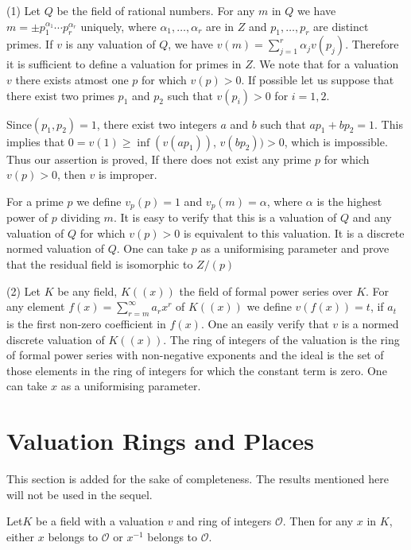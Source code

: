 \begin{examples*}
  (1)  Let $Q$ be the field of rational numbers. For any $m$ in $Q$
  we have $m = \pm p^{\alpha_1}_1 \cdots p^{\alpha_r}_r$ uniquely,
  where $\alpha_1, \ldots, \alpha_r$ are in $Z$ and $p_1, \ldots, p_r$
  are distinct primes. If $v$ is any valuation of $Q$, we have $v (m)
  = \sum\limits^r_{j=1} \alpha_j v (p_j)$. Therefore it is sufficient
  to define a valuation for primes in $Z$. We note that for a
  valuation $v$ there exists atmost one $p$ for which $v(p)> 0$. If
  possible let us suppose that there exist two primes $p_1$ and $p_2$
  such that $v(p_i)> 0$ for $i = 1, 2$. 
  
  Since\pageoriginale $(p_1, p_2)=1$, there exist two integers $a$ and
  $b$ such that 
  $ap_1 + bp_2 =1$. This implies that $0=v (1) \geq \inf (v(ap_1))$, $v
  (bp_2))>0$, which is impossible. Thus our assertion is proved, If
  there does not exist any prime $p$ for which $v(p)>0$, then $v$ is
  improper.  
  
  For  a prime $p$ we define $v_p(p) =1$ and $v_p(m)= \alpha$, where
  $\alpha$ is the highest power of $p$ dividing $m$. It is easy to
  verify that this is a valuation of $Q$ and any valuation of $Q$ for
  which $v(p)>0$ is equivalent to this valuation. It is a discrete normed
  valuation of $Q$. One can take $p$ as a uniformising parameter and
  prove that the residual field is isomorphic to $Z/(p)$   
  
  (2)  Let $K$ be any field, $K((x))$ the field of formal power series
  over $K$. For any element $f(x) = \sum\limits^\infty_{r = m} a_r x^r$
  of $K ((x))$ we define $v (f(x)) = t$, if $a_t$ is the first non-zero
  coefficient in $f(x)$. One an easily verify that $v$ is a normed discrete
  valuation of $K ((x))$. The ring of integers of  the valuation is the
  ring of formal power series with non-negative exponents and the ideal
  is the set of those elements in the ring of integers for which the
  constant term is zero. One can take $x$ as a uniformising parameter.  
\end{examples*}

\section{Valuation Rings and Places}\label{part1:chap1:sec2}

This section is added for the sake of completeness. The results
mentioned here will not be used in the sequel. 

\begin{remark*}
  Let\pageoriginale $K$ be a field with a valuation $v$ and ring of integers
  $\mathscr{O}$. Then for any $x$ in $K$, either $x$ belongs to
  $\mathscr{O}$ or $x^{-1}$ belongs to $\mathscr{O}$. 
\end{remark*}

